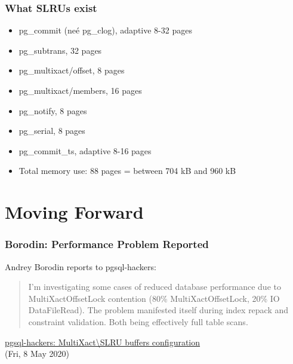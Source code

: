 \begin{frame}
   \frametitle{What SLRUs exist}

   \begin{itemize}
      \item pg\_commit (neé pg\_clog), adaptive 8-32 pages
      \item pg\_subtrans, 32 pages
      \item pg\_multixact/offset, 8 pages
      \item pg\_multixact/members, 16 pages
      \item pg\_notify, 8 pages
      \item pg\_serial, 8 pages
      \item pg\_commit\_ts, adaptive 8-16 pages
      \item Total memory use: 88 pages = between 704 kB and 960 kB
   \end{itemize}
\end{frame}

\section{Moving Forward}
\begin{frame}
  \sectionpage
\end{frame}

\begin{frame}
  \frametitle{Borodin: Performance Problem Reported}
   Andrey Borodin reports to pgsql-hackers:
	 \begin{quote}
	    \linksize I'm investigating some cases of reduced database
	    performance due to MultiXactOffsetLock contention (80\%
	    MultiXactOffsetLock, 20\% IO DataFileRead).  The problem manifested
	    itself during index repack and constraint validation. Both being
	    effectively full table scans.
	 \end{quote}
	 {\linksize \href{https://postgr.es/m/2BEC2B3F-9B61-4C1D-9FB5-5FAB0F05EF86@yandex-team.ru}
	 {pgsql-hackers: MultiXact\textbackslash{}SLRU buffers configuration} \faExternalLink \\ (Fri, 8 May 2020) }
\end{frame}

